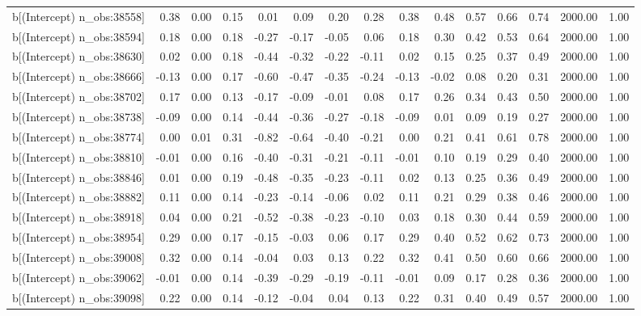 \begin{table}[ht]
\begin{tabular}{rrrrrrrrrrrrrrr}
  b[(Intercept) n\_obs:38558] & 0.38 & 0.00 & 0.15 & 0.01 & 0.09 & 0.20 & 0.28 & 0.38 & 0.48 & 0.57 & 0.66 & 0.74 & 2000.00 & 1.00 \\ 
  b[(Intercept) n\_obs:38594] & 0.18 & 0.00 & 0.18 & -0.27 & -0.17 & -0.05 & 0.06 & 0.18 & 0.30 & 0.42 & 0.53 & 0.64 & 2000.00 & 1.00 \\ 
  b[(Intercept) n\_obs:38630] & 0.02 & 0.00 & 0.18 & -0.44 & -0.32 & -0.22 & -0.11 & 0.02 & 0.15 & 0.25 & 0.37 & 0.49 & 2000.00 & 1.00 \\ 
  b[(Intercept) n\_obs:38666] & -0.13 & 0.00 & 0.17 & -0.60 & -0.47 & -0.35 & -0.24 & -0.13 & -0.02 & 0.08 & 0.20 & 0.31 & 2000.00 & 1.00 \\ 
  b[(Intercept) n\_obs:38702] & 0.17 & 0.00 & 0.13 & -0.17 & -0.09 & -0.01 & 0.08 & 0.17 & 0.26 & 0.34 & 0.43 & 0.50 & 2000.00 & 1.00 \\ 
  b[(Intercept) n\_obs:38738] & -0.09 & 0.00 & 0.14 & -0.44 & -0.36 & -0.27 & -0.18 & -0.09 & 0.01 & 0.09 & 0.19 & 0.27 & 2000.00 & 1.00 \\ 
  b[(Intercept) n\_obs:38774] & 0.00 & 0.01 & 0.31 & -0.82 & -0.64 & -0.40 & -0.21 & 0.00 & 0.21 & 0.41 & 0.61 & 0.78 & 2000.00 & 1.00 \\ 
  b[(Intercept) n\_obs:38810] & -0.01 & 0.00 & 0.16 & -0.40 & -0.31 & -0.21 & -0.11 & -0.01 & 0.10 & 0.19 & 0.29 & 0.40 & 2000.00 & 1.00 \\ 
  b[(Intercept) n\_obs:38846] & 0.01 & 0.00 & 0.19 & -0.48 & -0.35 & -0.23 & -0.11 & 0.02 & 0.13 & 0.25 & 0.36 & 0.49 & 2000.00 & 1.00 \\ 
  b[(Intercept) n\_obs:38882] & 0.11 & 0.00 & 0.14 & -0.23 & -0.14 & -0.06 & 0.02 & 0.11 & 0.21 & 0.29 & 0.38 & 0.46 & 2000.00 & 1.00 \\ 
  b[(Intercept) n\_obs:38918] & 0.04 & 0.00 & 0.21 & -0.52 & -0.38 & -0.23 & -0.10 & 0.03 & 0.18 & 0.30 & 0.44 & 0.59 & 2000.00 & 1.00 \\ 
  b[(Intercept) n\_obs:38954] & 0.29 & 0.00 & 0.17 & -0.15 & -0.03 & 0.06 & 0.17 & 0.29 & 0.40 & 0.52 & 0.62 & 0.73 & 2000.00 & 1.00 \\ 
  b[(Intercept) n\_obs:39008] & 0.32 & 0.00 & 0.14 & -0.04 & 0.03 & 0.13 & 0.22 & 0.32 & 0.41 & 0.50 & 0.60 & 0.66 & 2000.00 & 1.00 \\ 
  b[(Intercept) n\_obs:39062] & -0.01 & 0.00 & 0.14 & -0.39 & -0.29 & -0.19 & -0.11 & -0.01 & 0.09 & 0.17 & 0.28 & 0.36 & 2000.00 & 1.00 \\ 
  b[(Intercept) n\_obs:39098] & 0.22 & 0.00 & 0.14 & -0.12 & -0.04 & 0.04 & 0.13 & 0.22 & 0.31 & 0.40 & 0.49 & 0.57 & 2000.00 & 1.00 \\ 

\end{tabular}
\end{table}
